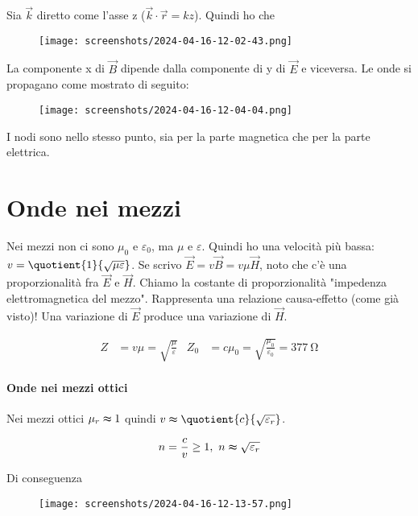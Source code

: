 Sia \(\vec{k}\) diretto come l'asse z (\(\vec{k}\cdot \vec{r}=kz\)). Quindi ho che 
\begin{figure}[H]
	\centering
	\texttt{[image: screenshots/2024-04-16-12-02-43.png]}
\end{figure}
La componente x di \(\vec{B}\) dipende dalla componente di y di \(\vec{E}\) e viceversa. Le onde si propagano come mostrato di seguito:
\begin{figure}[H]
	\centering
	\texttt{[image: screenshots/2024-04-16-12-04-04.png]}
\end{figure}
I nodi sono nello stesso punto, sia per la parte magnetica che per la parte elettrica.

\section{Onde nei mezzi}
Nei mezzi non ci sono \(\mu _0\) e \(\varepsilon_0\), ma \(\mu\) e \(\varepsilon \). Quindi ho una velocità più bassa: \(v=\quotient{1}{\sqrt{\mu \varepsilon } } \). Se scrivo \(\vec{E}=v \vec{B}=v \mu \vec{H}\), noto che c'è una proporzionalità fra \(\vec{E}\) e \(\vec{H}\). Chiamo la costante di proporzionalità "impedenza elettromagnetica del mezzo". Rappresenta una relazione causa-effetto (come già visto)! Una variazione di \(\vec{E}\) produce una variazione di \(\vec{H}\).

\begin{definition}
	\begin{align}
		Z &= v \mu = \sqrt{\frac{\mu }{\varepsilon }} & 
		Z_0 &= c \mu _0 = \sqrt{\frac{\mu _0}{\varepsilon _0}}=\SI{377}{\ohm} 
	\end{align}
\end{definition}

\paragraph{Onde nei mezzi ottici}
Nei mezzi ottici \(\mu _r \thickapprox 1\) quindi \(v\thickapprox \quotient{c}{\sqrt{\varepsilon _r} } \).
\begin{definition}
	\begin{equation}
		n=\frac{c}{v}\geq 1,\ n \thickapprox \sqrt{\varepsilon _r} 
	\end{equation}	
\end{definition}
Di conseguenza
\begin{figure}[H]
	\centering
	\texttt{[image: screenshots/2024-04-16-12-13-57.png]}
\end{figure}